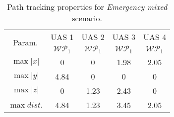     \begin{table}[H]
        \centering
        \begin{tabular}{c||c|c|c|c}
            \multirow{2}{*}{Param.} & UAS 1     & UAS 2             & UAS 3             & UAS 4 \\\cline{2-5}
                            & $\mathscr{WP}_1$  & $\mathscr{WP}_1$  & $\mathscr{WP}_1$  & $\mathscr{WP}_1$ \\\hline\hline
              $\max |x|$    & 0                 & 0                 & 1.98              & 2.05\\\hline
              $\max |y|$    & 4.84              & 0                 & 0                 & 0\\\hline
              $\max |z|$    & 0                 & 1.23              & 2.43              & 0\\\hline
              $\max dist.$  & 4.84              & 1.23              & 3.45              & 2.05\\
        \end{tabular}
        \caption{Path tracking properties for \emph{Emergency mixed} scenario.}
        \label{tab:pathTrackingParametersForEmergencyMixed}
    \end{table}    


